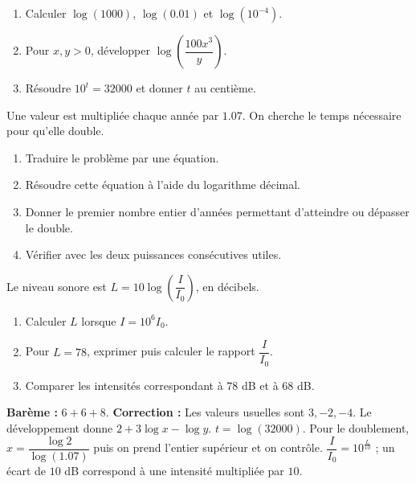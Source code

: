 \begin{exercise}
\begin{enumerate}
\item Calculer $\log(1000)$, $\log(\num{0,01})$ et $\log(10^{-4})$.
\item Pour $x,y>0$, développer $\log\!\left(\dfrac{100x^3}{y} \right)$.
\item Résoudre $10^t=32000$ et donner $t$ au centième.
\end{enumerate}
\end{exercise}
\begin{exercise}
Une valeur est multipliée chaque année par $\num{1,07}$. On cherche le temps nécessaire pour qu'elle double.
\begin{enumerate}
\item Traduire le problème par une équation.
\item Résoudre cette équation à l'aide du logarithme décimal.
\item Donner le premier nombre entier d'années permettant d'atteindre ou dépasser le double.
\item Vérifier avec les deux puissances consécutives utiles.
\end{enumerate}
\end{exercise}
\begin{exercise}
Le niveau sonore est $L=10\log\!\left(\dfrac I{I_0}\right)$, en décibels.
\begin{enumerate}
\item Calculer $L$ lorsque $I=10^6I_0$.
\item Pour $L=78$, exprimer puis calculer le rapport $\dfrac I{I_0}$.
\item Comparer les intensités correspondant à $78$ dB et à $68$ dB.
\end{enumerate}
\end{exercise}
\begin{solution}\textbf{Barème :} $6+6+8$. \textbf{Correction :} Les valeurs usuelles sont $3,-2,-4$. Le développement donne $2+3\log x-\log y$. $t=\log(32000)$. Pour le doublement, $x=\dfrac{\log2}{\log(\num{1,07})}$ puis on prend l'entier supérieur et on contrôle. $\dfrac I{I_0}=10^{\frac L{10}}$ ; un écart de $10$ dB correspond à une intensité multipliée par $10$.\end{solution}

